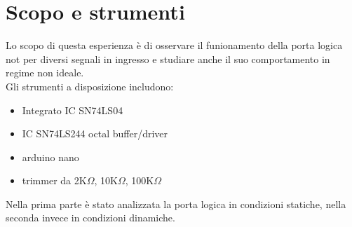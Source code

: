 \section{Scopo e strumenti}
Lo scopo di questa esperienza è di osservare il funionamento della porta logica not per diversi segnali in ingresso e studiare anche il suo comportamento in regime non ideale.\\
Gli strumenti a disposizione includono:
\begin{itemize}
\item{Integrato IC SN74LS04}
\item{IC SN74LS244 octal buffer/driver}
\item{arduino nano}
\item{trimmer da 2K$\Omega$, 10K$\Omega$, 100K$\Omega$}
\end{itemize}
Nella prima parte è stato analizzata la porta logica in condizioni statiche, nella seconda invece in condizioni dinamiche.\\

